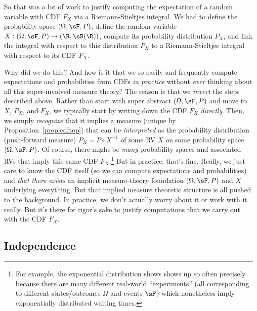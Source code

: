 \documentclass[12pt]{article}
\theoremstyle{plain}
\theoremstyle{definition}
\theoremstyle{remark}
\newcommand{\ra}{\rightarrow}
\begin{document}
So that was a lot of work to justify computing the expectation of a
random variable with CDF $F_X$ via a Riemann-Stieltjes integral.  We had
to define the probability space $(\Omega,\sF,P)$, define the random
variable $X:(\Omega,\sF,P)\ra(\R,\sB(\R))$, compute its probability
distribution $P_X$, and link the integral with respect to this
distribution $P_X$ to a Riemann-Stieltjes integral with respect to its
CDF $F_X$.

Why did we do this? And how is it that we so easily and frequently
compute expectations and probabilities from CDFs \emph{in practice}
without \emph{ever} thinking about all this super-involved measure
theory?  The reason is that we \emph{invert} the steps described above.
Rather than start with super abstract $(\Omega,\sF,P)$ and move to
$X$, $P_X$, and $F_X$, we typically start by writing down the CDF $F_X$
\emph{directly}.  Then, we simply \emph{recognize} that it
implies a measure (unique by Proposition~\ref{prop:cdftop})
that can be \emph{interpreted} as the probability distribution
(push-forward measure) $P_X=P\circ X^{-1}$ of some RV $X$ on some
probability space $(\Omega,\sF,P)$.
Of course, there might be \emph{many} probability spaces and associated
RVs that imply this same CDF $F_X$.\footnote{%
  For example, the exponential distribution shows shows up so often
  precisely because there are many different real-world ``experiments''
  (all corresponding to different states/outcomes $\Omega$ and events
  $\sF$) which nonetheless imply exponentially distributed waiting
  times.
}
But in practice, that's fine. Really, we just care to know the CDF
itself (so we can compute expectations and probabilities) and
\emph{that there exists} an implicit measure-theory foundation
$(\Omega,\sF,P)$ and $X$ underlying everything.
But that implied measure theoretic structure is all pushed to the
background. In practice, we don't actually worry about it or work with
it really. But it's there for rigor's sake to justify computations
that we carry out with the CDF $F_X$.

\clearpage
\subsection{Independence}
\label{sec:independence}
\end{document}
